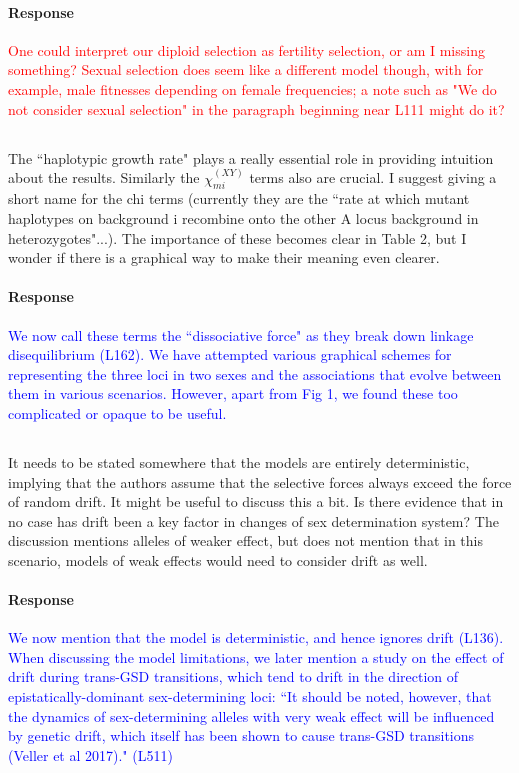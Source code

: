 \documentclass[10pt,letterpaper]{article}
\begin{document}
\noindent\paragraph{Response}
\textcolor{red}{One could interpret our diploid selection as fertility selection, or am I missing something? Sexual selection does seem like a different model though, with for example, male fitnesses depending on female frequencies; a note such as "We do not consider sexual selection" in the paragraph beginning near L111 might do it?}

\noindent\subsection{}
The ``haplotypic growth rate" plays a really essential role in providing intuition about the results. Similarly the $\chi_{mi}^{(XY)}$ terms also are crucial.  I suggest giving a short name for the chi terms (currently they are the ``rate at which mutant haplotypes on background i recombine onto the other A locus background in heterozygotes"...).   The importance of these becomes clear in Table 2, but I wonder if there is a graphical way to make their meaning even clearer.  

\noindent\paragraph{Response}
\textcolor{blue}{We now call these terms the ``dissociative force" as they break down linkage disequilibrium (L162). We have attempted various graphical schemes for representing the three loci in two sexes and the associations that evolve between them in various scenarios. However, apart from Fig 1, we found these too complicated or opaque to be useful. }

\noindent\subsection{}
It needs to be stated somewhere that the models are entirely deterministic, implying that the authors assume that the selective forces always exceed the force of random drift. It might be useful to discuss this a bit. Is there evidence that in no case has drift been a key factor in changes of sex determination system?  The discussion mentions alleles of weaker effect, but does not mention that in this scenario, models of weak effects would need to consider drift as well.

\noindent\paragraph{Response}
\textcolor{blue}{We now mention that the model is deterministic, and hence ignores drift (L136). 
When discussing the model limitations, we later mention a study on the effect of drift during trans-GSD transitions, which tend to drift in the direction of epistatically-dominant sex-determining loci: ``It should be noted, however, that the dynamics of sex-determining alleles with very weak effect will be influenced by genetic drift, which itself has been shown to cause trans-GSD transitions (Veller et al 2017)." (L511)}
\end{document}
